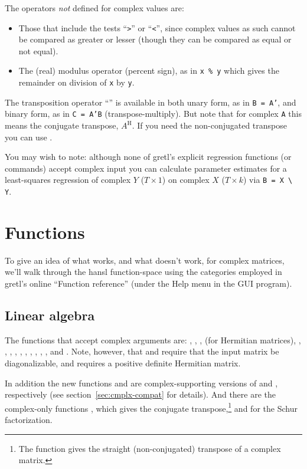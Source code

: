 The operators \textit{not} defined for complex values are:
\begin{itemize}
\item Those that include the tests ``\verb+>+'' or ``\verb+<+'', since
  complex values as such cannot be compared as greater or lesser
  (though they can be compared as equal or not equal).
\item The (real) modulus operator (percent sign), as in \texttt{x \%
    y} which gives the remainder on division of \texttt{x} by
  \texttt{y}.
\end{itemize}

The transposition operator ``'' is available in both unary
form, as in \texttt{B = A'}, and binary form, as in \texttt{C = A'B}
(transpose-multiply). But note that for complex \texttt{A} this means
the conjugate transpose, $A^\mathrm{H}$. If you need the
non-conjugated transpose you can use .

You may wish to note: although none of gretl's explicit regression
functions (or commands) accept complex input you can calculate
parameter estimates for a least-squares regression of complex $Y$
($T \times 1$) on complex $X$ ($T \times k$) via \verb|B = X \ Y|.

\section{Functions}
\label{sec:cmplx-funcs}

To give an idea of what works, and what doesn't work, for complex
matrices, we'll walk through the hansl function-space using the
categories employed in gretl's online ``Function reference'' (under the
\textsf{Help} menu in the GUI program).

\subsection{Linear algebra}

The functions that accept complex arguments are: ,
, ,  (for Hermitian matrices),
, , , , ,
, , , , , and
. Note, however, that  and  require
that the input matrix be diagonalizable, and  requires a
positive definite Hermitian matrix.

In addition the new functions  and  are
complex-supporting versions of  and ,
respectively (see section~\ref{sec:cmplx-compat} for details). And
there are the complex-only functions , which gives the
conjugate transpose,\footnote{The  function gives the
  straight (non-conjugated) transpose of a complex matrix.} and
 for the Schur factorization.

